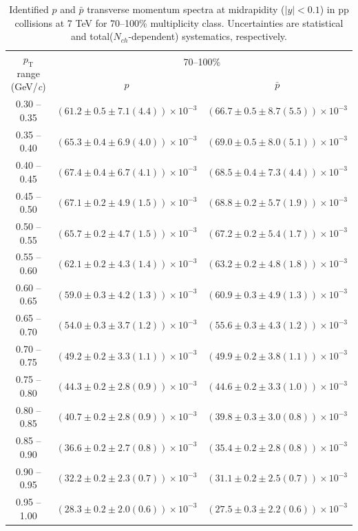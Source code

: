 \begin{table}
\caption{Identified $p$ and $\bar{p}$  transverse momentum spectra at midrapidity ($|y|<0.1$) in pp collisions at 7 TeV for 70--100\% multiplicity class. Uncertainties are statistical and total($N_{ch}$-dependent) systematics, respectively.}
\label{tab:ProtonPlus_ProtonMinus_70to100}
\begin{center}
\begin{tabular}{ c | c c }
\hline
\multirow{2}{*}{$p_{\mathrm{T}}$ range (GeV/\textit{c})} & \multicolumn{2}{c}{70--100\%} \\ & $p$& $\bar{p}$\\ 
\hline
0.30 -- 0.35 & $(61.2\pm0.5\pm7.1(4.4))\times10^{-3}$ & $(66.7\pm0.5\pm8.7(5.5))\times10^{-3}$ \\ 
0.35 -- 0.40 & $(65.3\pm0.4\pm6.9(4.0))\times10^{-3}$ & $(69.0\pm0.5\pm8.0(5.1))\times10^{-3}$ \\ 
0.40 -- 0.45 & $(67.4\pm0.4\pm6.7(4.1))\times10^{-3}$ & $(68.5\pm0.4\pm7.3(4.4))\times10^{-3}$ \\ 
0.45 -- 0.50 & $(67.1\pm0.2\pm4.9(1.5))\times10^{-3}$ & $(68.8\pm0.2\pm5.7(1.9))\times10^{-3}$ \\ 
0.50 -- 0.55 & $(65.7\pm0.2\pm4.7(1.5))\times10^{-3}$ & $(67.2\pm0.2\pm5.4(1.7))\times10^{-3}$ \\ 
0.55 -- 0.60 & $(62.1\pm0.2\pm4.3(1.4))\times10^{-3}$ & $(63.2\pm0.2\pm4.8(1.8))\times10^{-3}$ \\ 
0.60 -- 0.65 & $(59.0\pm0.3\pm4.2(1.3))\times10^{-3}$ & $(60.9\pm0.3\pm4.9(1.3))\times10^{-3}$ \\ 
0.65 -- 0.70 & $(54.0\pm0.3\pm3.7(1.2))\times10^{-3}$ & $(55.6\pm0.3\pm4.3(1.2))\times10^{-3}$ \\ 
0.70 -- 0.75 & $(49.2\pm0.2\pm3.3(1.1))\times10^{-3}$ & $(49.9\pm0.2\pm3.8(1.1))\times10^{-3}$ \\ 
0.75 -- 0.80 & $(44.3\pm0.2\pm2.8(0.9))\times10^{-3}$ & $(44.6\pm0.2\pm3.3(1.0))\times10^{-3}$ \\ 
0.80 -- 0.85 & $(40.7\pm0.2\pm2.8(0.9))\times10^{-3}$ & $(39.8\pm0.3\pm3.0(0.8))\times10^{-3}$ \\ 
0.85 -- 0.90 & $(36.6\pm0.2\pm2.7(0.8))\times10^{-3}$ & $(35.4\pm0.2\pm2.8(0.8))\times10^{-3}$ \\ 
0.90 -- 0.95 & $(32.2\pm0.2\pm2.3(0.7))\times10^{-3}$ & $(31.1\pm0.2\pm2.5(0.7))\times10^{-3}$ \\ 
0.95 -- 1.00 & $(28.3\pm0.2\pm2.0(0.6))\times10^{-3}$ & $(27.5\pm0.3\pm2.2(0.6))\times10^{-3}$ \\ 

\end{tabular}
\end{center}
\end{table}
